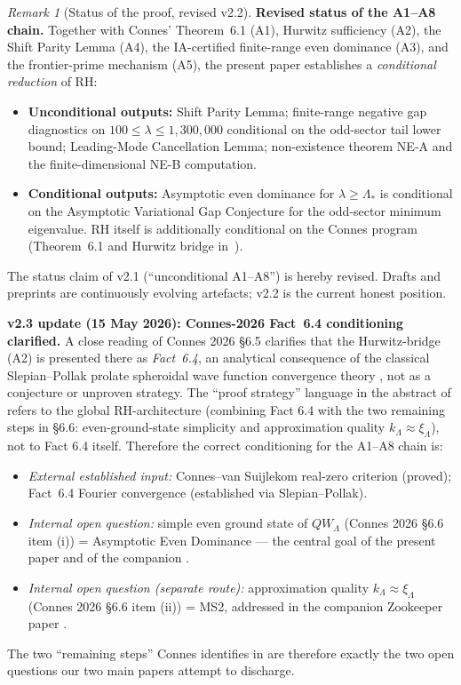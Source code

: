 \documentclass[12pt,a4paper]{article}
\theoremstyle{definition}
\theoremstyle{remark}
\newtheorem{remark}[theorem]{Remark}
\begin{document}
\begin{remark}[Status of the proof, revised v2.2]
\textbf{Revised status of the A1--A8 chain.}
Together with Connes' Theorem~6.1 (A1), Hurwitz sufficiency (A2), the
Shift Parity Lemma (A4), the IA-certified finite-range even dominance
(A3), and the frontier-prime mechanism (A5), the present paper
establishes a \emph{conditional reduction} of RH:
\begin{itemize}
  \item \textbf{Unconditional outputs:} Shift Parity Lemma; finite-range
    negative gap diagnostics on $100 \le \lambda \le 1{,}300{,}000$
    conditional on the odd-sector tail lower bound; Leading-Mode
    Cancellation Lemma; non-existence theorem NE-A and the finite-dimensional
    NE-B computation.
  \item \textbf{Conditional outputs:} Asymptotic even dominance for
    $\lambda \ge \Lambda_*$ is conditional on the Asymptotic Variational
    Gap Conjecture for the odd-sector minimum eigenvalue.  RH itself is
    additionally conditional on the Connes program (Theorem~6.1 and
    Hurwitz bridge in~\cite{Connes2026, ConnesvS2025}).
\end{itemize}
The status claim of v2.1 (``unconditional A1--A8'') is hereby revised.
Drafts and preprints are continuously evolving artefacts; v2.2 is the
current honest position.

\medskip\noindent
\textbf{v2.3 update (15 May 2026): Connes-2026 Fact~6.4 conditioning
clarified.}  A close reading of Connes 2026 §6.5 \cite{Connes2026}
clarifies that the Hurwitz-bridge (A2) is presented there as
\emph{Fact~6.4}, an analytical consequence of the classical
Slepian--Pollak prolate spheroidal wave function convergence theory
\cite[Theorem~1 of reference~47]{Connes2026}, not as a conjecture or
unproven strategy.  The ``proof strategy'' language in the abstract
of \cite{Connes2026} refers to the global RH-architecture
(combining Fact 6.4 with the two remaining steps in §6.6:
even-ground-state simplicity and approximation quality
$k_\Lambda\approx\xi_\Lambda$), not to Fact 6.4 itself.  Therefore the
correct conditioning for the A1--A8 chain is:
\begin{itemize}
  \item \emph{External established input:} Connes--van Suijlekom
    real-zero criterion \cite{ConnesvS2025} (proved); Fact~6.4
    Fourier convergence \cite[§6.5]{Connes2026} (established via
    Slepian--Pollak).
  \item \emph{Internal open question:} simple even ground state of
    $QW_\Lambda$ (Connes 2026 §6.6 item (i)) = Asymptotic Even
    Dominance --- the central goal of the present paper and of the
    companion \cite{Geiger2026evendom}.
  \item \emph{Internal open question (separate route):}
    approximation quality $k_\Lambda \approx \xi_\Lambda$
    (Connes 2026 §6.6 item (ii)) = MS2, addressed in the companion
    Zookeeper paper \cite{Geiger2026zookeeper}.
\end{itemize}
The two ``remaining steps'' Connes identifies in \cite[§6.6]{Connes2026}
are therefore exactly the two open questions our two main papers
attempt to discharge.


\end{remark}
\end{document}
